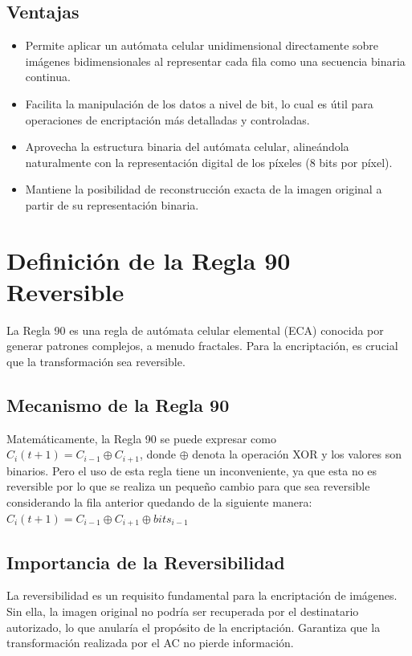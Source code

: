 \subsection{Ventajas}
\begin{itemize}
\item Permite aplicar un autómata celular unidimensional directamente sobre imágenes bidimensionales al representar cada fila como una secuencia binaria continua.
\item Facilita la manipulación de los datos a nivel de bit, lo cual es útil para operaciones de encriptación más detalladas y controladas.
\item Aprovecha la estructura binaria del autómata celular, alineándola naturalmente con la representación digital de los píxeles (8 bits por píxel).
\item Mantiene la posibilidad de reconstrucción exacta de la imagen original a partir de su representación binaria.
\end{itemize}

\section{Definición de la Regla 90 Reversible}
La Regla 90 es una regla de autómata celular elemental (ECA) conocida por generar patrones complejos, a menudo fractales. Para la encriptación, es crucial que la transformación sea reversible.

\subsection*{Mecanismo de la Regla 90}
Matemáticamente, la Regla 90 se puede expresar como \( C_i(t+1) = C_{i-1} \oplus C_{i+1} \), donde \( \oplus \) denota la operación XOR y los valores son binarios. Pero el uso de esta regla tiene un inconveniente, ya que esta no es reversible por lo que se realiza un pequeño cambio para que sea reversible considerando la fila anterior quedando de la siguiente manera:\( C_i(t+1) = C_{i-1} \oplus C_{i+1} \oplus bits_{i-1}\) 

\subsection*{Importancia de la Reversibilidad}
La reversibilidad es un requisito fundamental para la encriptación de imágenes. Sin ella, la imagen original no podría ser recuperada por el destinatario autorizado, lo que anularía el propósito de la encriptación. Garantiza que la transformación realizada por el AC no pierde información.

